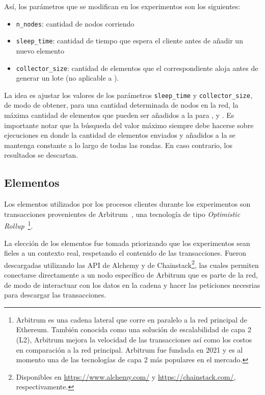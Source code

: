 Así, los parámetros que se modifican en los experimentos son los siguientes:
\begin{itemize}
	\item \texttt{n\_nodes}: cantidad de nodos corriendo
	\item \texttt{sleep\_time}: cantidad de tiempo que espera el cliente antes de añadir un nuevo elemento
	\item \texttt{collector\_size}: cantidad de elementos que el correspondiente \collector aloja antes de generar
	un lote (no aplicable a \vanilla).
\end{itemize}
La idea es ajustar los valores de los parámetros \texttt{sleep\_time} y \texttt{collector\_size},
de modo de obtener, para una cantidad determinada de nodos en la red, la máxima cantidad de elementos que pueden ser
añadidos a la \setchain para \vanilla, \compresschain y \hashchain.
Es importante notar que la búsqueda del valor máximo siempre debe hacerse sobre ejecuciones en donde la cantidad de elementos
enviados y añadidos a la \setchain se mantenga constante a lo largo de todas las rondas.
En caso contrario, los resultados se descartan.


\subsection{Elementos}
Los elementos utilizados por los procesos clientes durante los experimentos son transacciones provenientes
de Arbitrum~\cite{Kalodner2018Arbitrum}, una tecnología de tipo \textit{Optimistic Rollup}~\footnote{
Arbitrum es una cadena lateral que corre en paralelo a la red principal de Ethereum.
También conocida como una solución de escalabilidad de capa 2 (L2), Arbitrum mejora la velocidad de las transacciones así
como los costos en comparación a la red principal.
Arbitrum fue fundada en 2021 y es al momento una de las tecnologías de capa 2 más populares en el mercado.}.
%

La elección de los elementos fue tomada priorizando que los experimentos sean fieles a un contexto
real, respetando el contenido de las transacciones.
%
Fueron descargadas utilizando las API de Alchemy y de Chainstack\footnote{Disponibles en \url{https://www.alchemy.com/} y \url{https://chainstack.com/},
respectivamente.}, las
cuales permiten conectarse directamente a un nodo específico de Arbitrum que es parte de la red,
de modo de interactuar con los datos en la cadena y hacer las peticiones necesrias para descargar las transacciones.

